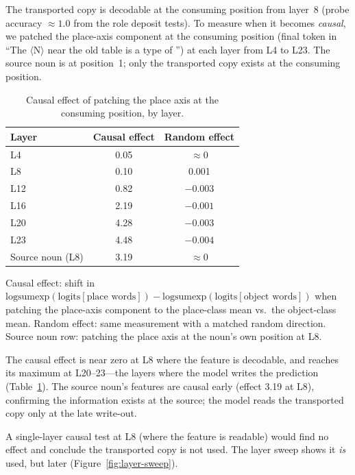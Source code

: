 \documentclass[11pt,a4paper]{article}
\begin{document}
The transported copy is decodable at the consuming position from layer~8 (probe accuracy
$\approx 1.0$ from the role deposit tests). To measure when it becomes \emph{causal}, we
patched the place-axis component at the consuming position (final token in ``The
$\langle$N$\rangle$ near the old table is a type of \underline{\hspace{1cm}}'') at each
layer from L4 to L23. The source noun is at position~1; only the transported copy exists at
the consuming position.

\begin{table}[t]
\centering
\caption{Causal effect of patching the place axis at the consuming position, by layer.}
\label{tab:layer-sweep}
\begin{tabular}{lcc}
\toprule
Layer & Causal effect & Random effect \\
\midrule
L4  & 0.05 & $\approx 0$ \\
L8  & 0.10 & 0.001 \\
L12 & 0.82 & $-0.003$ \\
L16 & 2.19 & $-0.001$ \\
L20 & 4.28 & $-0.003$ \\
L23 & 4.48 & $-0.004$ \\
\midrule
Source noun (L8) & 3.19 & $\approx 0$ \\
\bottomrule
\end{tabular}

\smallskip\small
Causal effect: shift in $\mathrm{logsumexp}(\text{logits}[\text{place words}]) -
\mathrm{logsumexp}(\text{logits}[\text{object words}])$ when patching the place-axis
component to the place-class mean vs.\ the object-class mean. Random effect: same
measurement with a matched random direction. Source noun row: patching the place axis at the
noun's own position at L8.
\end{table}

The causal effect is near zero at L8 where the feature is decodable, and reaches its maximum
at L20--23---the layers where the model writes the prediction
(Table~\ref{tab:layer-sweep}). The source noun's features are causal early (effect 3.19 at
L8), confirming the information exists at the source; the model reads the transported copy
only at the late write-out.

A single-layer causal test at L8 (where the feature is readable) would find no effect and
conclude the transported copy is not used. The layer sweep shows it \emph{is} used, but
later (Figure~\ref{fig:layer-sweep}).
\end{document}
